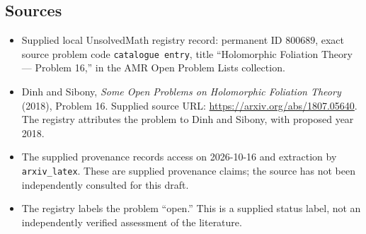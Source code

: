 \documentclass[11pt]{article}
\begin{document}
\subsection{Sources}
\begin{itemize}
\item Supplied local UnsolvedMath registry record: permanent ID \(800689\), exact source problem code \texttt{catalogue entry}, title ``Holomorphic Foliation Theory --- Problem 16,'' in the AMR Open Problem Lists collection.
\item Dinh and Sibony, \emph{Some Open Problems on Holomorphic Foliation Theory} (2018), Problem 16. Supplied source URL: \url{https://arxiv.org/abs/1807.05640}. The registry attributes the problem to Dinh and Sibony, with proposed year 2018.
\item The supplied provenance records access on 2026-10-16 and extraction by \texttt{arxiv\_latex}. These are supplied provenance claims; the source has not been independently consulted for this draft.
\item The registry labels the problem ``open.'' This is a supplied status label, not an independently verified assessment of the literature.
\end{itemize}
\end{document}
